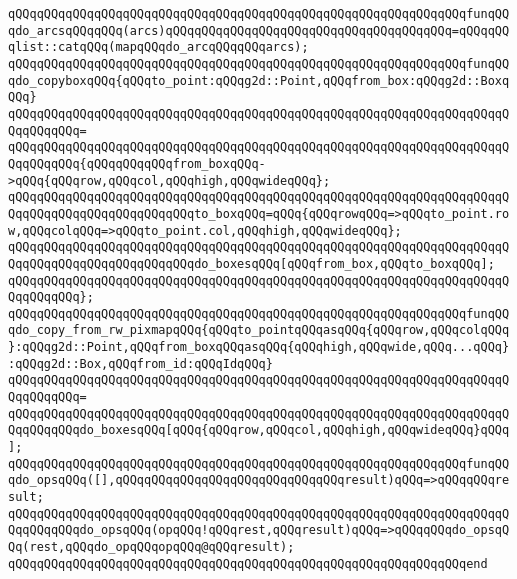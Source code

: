 \verb|qQQqqQQqqQQqqQQqqQQqqQQqqQQqqQQqqQQqqQQqqQQqqQQqqQQqqQQqqQQqqQQqfunqQQqdo_arcsqQQqqQQq(arcs)qQQqqQQqqQQqqQQqqQQqqQQqqQQqqQQqqQQqqQQq=qQQqqQQqlist::catqQQq(mapqQQqdo_arcqQQqqQQqarcs);|\newline
\newline
\verb|qQQqqQQqqQQqqQQqqQQqqQQqqQQqqQQqqQQqqQQqqQQqqQQqqQQqqQQqqQQqqQQqfunqQQqdo_copyboxqQQq{qQQqto_point:qQQqg2d::Point,qQQqfrom_box:qQQqg2d::BoxqQQq}|\newline
\verb|qQQqqQQqqQQqqQQqqQQqqQQqqQQqqQQqqQQqqQQqqQQqqQQqqQQqqQQqqQQqqQQqqQQqqQQqqQQqqQQq=|\newline
\verb|qQQqqQQqqQQqqQQqqQQqqQQqqQQqqQQqqQQqqQQqqQQqqQQqqQQqqQQqqQQqqQQqqQQqqQQqqQQqqQQq{qQQqqQQqqQQqfrom_boxqQQq->qQQq{qQQqrow,qQQqcol,qQQqhigh,qQQqwideqQQq};|\newline
\verb|qQQqqQQqqQQqqQQqqQQqqQQqqQQqqQQqqQQqqQQqqQQqqQQqqQQqqQQqqQQqqQQqqQQqqQQqqQQqqQQqqQQqqQQqqQQqqQQqto_boxqQQq=qQQq{qQQqrowqQQq=>qQQqto_point.row,qQQqcolqQQq=>qQQqto_point.col,qQQqhigh,qQQqwideqQQq};|\newline
\verb|qQQqqQQqqQQqqQQqqQQqqQQqqQQqqQQqqQQqqQQqqQQqqQQqqQQqqQQqqQQqqQQqqQQqqQQqqQQqqQQqqQQqqQQqqQQqqQQqdo_boxesqQQq[qQQqfrom_box,qQQqto_boxqQQq];|\newline
\verb|qQQqqQQqqQQqqQQqqQQqqQQqqQQqqQQqqQQqqQQqqQQqqQQqqQQqqQQqqQQqqQQqqQQqqQQqqQQqqQQq};|\newline
\newline
\verb|qQQqqQQqqQQqqQQqqQQqqQQqqQQqqQQqqQQqqQQqqQQqqQQqqQQqqQQqqQQqqQQqfunqQQqdo_copy_from_rw_pixmapqQQq{qQQqto_pointqQQqasqQQq{qQQqrow,qQQqcolqQQq}:qQQqg2d::Point,qQQqfrom_boxqQQqasqQQq{qQQqhigh,qQQqwide,qQQq...qQQq}:qQQqg2d::Box,qQQqfrom_id:qQQqIdqQQq}|\newline
\verb|qQQqqQQqqQQqqQQqqQQqqQQqqQQqqQQqqQQqqQQqqQQqqQQqqQQqqQQqqQQqqQQqqQQqqQQqqQQqqQQq=|\newline
\verb|qQQqqQQqqQQqqQQqqQQqqQQqqQQqqQQqqQQqqQQqqQQqqQQqqQQqqQQqqQQqqQQqqQQqqQQqqQQqqQQqdo_boxesqQQq[qQQq{qQQqrow,qQQqcol,qQQqhigh,qQQqwideqQQq}qQQq];|\newline
\newline
\verb|qQQqqQQqqQQqqQQqqQQqqQQqqQQqqQQqqQQqqQQqqQQqqQQqqQQqqQQqqQQqqQQqfunqQQqdo_opsqQQq([],qQQqqQQqqQQqqQQqqQQqqQQqqQQqqQQqresult)qQQq=>qQQqqQQqresult;|\newline
\verb|qQQqqQQqqQQqqQQqqQQqqQQqqQQqqQQqqQQqqQQqqQQqqQQqqQQqqQQqqQQqqQQqqQQqqQQqqQQqqQQqdo_opsqQQq(opqQQq!qQQqrest,qQQqresult)qQQq=>qQQqqQQqdo_opsqQQq(rest,qQQqdo_opqQQqopqQQq@qQQqresult);|\newline
\verb|qQQqqQQqqQQqqQQqqQQqqQQqqQQqqQQqqQQqqQQqqQQqqQQqqQQqqQQqqQQqqQQqend|\newline
